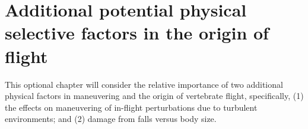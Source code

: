 %
%
%





\section{Additional potential physical selective factors in the origin of flight}
\label{sec:0Chap4}
This optional chapter will consider the relative importance of two additional physical factors in maneuvering and the origin of vertebrate flight, specifically, (1) the effects on maneuvering of in-flight perturbations due to turbulent environments; and (2) damage from falls versus body size.

